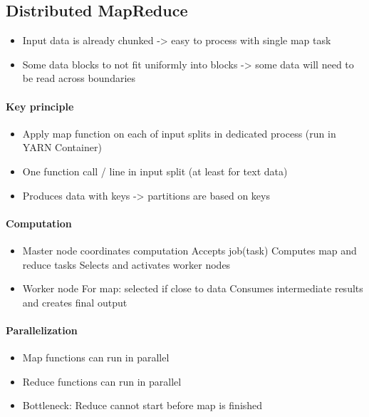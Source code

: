 \documentclass[10pt,a4paper]{scrreprt}
\begin{document}
\subsection{Distributed MapReduce}
\begin{itemize}
	\item Input data is already chunked -> easy to process with single map task
	\item Some data blocks to not fit uniformly into blocks -> some data will need to be read across boundaries
\end{itemize}

\paragraph{Key principle}
\begin{itemize}
	\item Apply map function on each of input splits in dedicated process (run in YARN Container)
	\item One function call / line in input split (at least for text data)
	\item Produces data with keys -> partitions are based on keys
\end{itemize}

\paragraph{Computation}
\begin{itemize}
	\item Master node coordinates computation
	\subitem Accepts job(task)
	\subitem Computes map and reduce tasks
	\subitem Selects and activates worker nodes
	\item Worker node
	\subitem For map: selected if close to data
	\subitem Consumes intermediate results and creates final output
\end{itemize}

\paragraph{Parallelization}
\begin{itemize}
	\item Map functions can run in parallel
	\item Reduce functions can run in parallel
	\item Bottleneck: Reduce cannot start before map is finished
\end{itemize}
\end{document}
